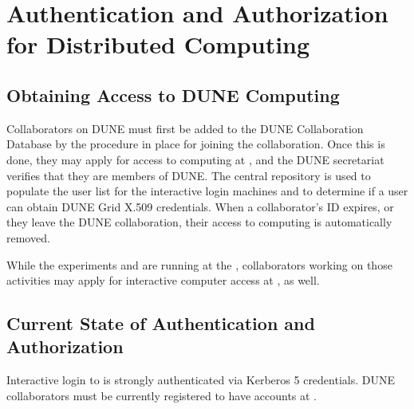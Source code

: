\documentclass[../main-v1.tex]{subfiles}
\begin{document}
\chapter{Authentication and Authorization for Distributed Computing}
\label{ch:auth}

\section{Obtaining Access to DUNE Computing}
\label{sec:auth:access}
Collaborators on DUNE must first be added to the DUNE Collaboration Database by the procedure in place for joining the collaboration.
Once this is done, they may apply for access to computing at , and the DUNE secretariat verifies that they
are members of DUNE.  %
The central repository %
is used to populate the user list for the 
 interactive login machines and to determine if a user can obtain DUNE Grid X.509 credentials.
 When a collaborator's  ID expires, or they leave the DUNE collaboration, their access to computing is automatically removed.
 
 While the  experiments  and  are running at the , %
 collaborators %
 working on those activities may  apply %
 for interactive computer access at , as well.

\section{Current State of Authentication and Authorization}
Interactive login to  is strongly authenticated via Kerberos 5 credentials.  %
DUNE collaborators must be currently registered to have accounts at .
\end{document}

